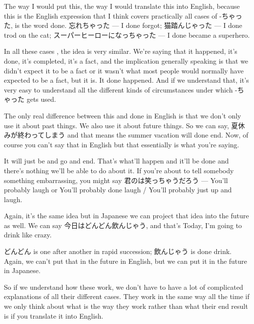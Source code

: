The way I would put this, the way I would translate this into English, because this is the English expression that I think covers practically all cases of -ちゃった, is the word done. 忘れちゃった --- I done forgot; 猫踏んじゃった --- I done trod on the cat; スーパーヒーローになっちゃった --- I done became a superhero.

In all these cases , the idea is very similar. We're saying that it happened, it's done, it's completed, it's a fact, and the implication generally speaking is that we didn't expect it to be a fact or it wasn't what most people would normally have expected to be a fact, but it is. It done happened. And if we understand that, it's very easy to understand all the different kinds of circumstances under which -ちゃった gets used.

The only real difference between this and done in English is that we don't only use it about past things. We also use it about future things. So we can say, 夏休みが終わってしまう and that means the summer vacation will done end. Now, of course you can't say that in English but that essentially is what you're saying.

It will just be and go and end. That's what'll happen and it'll be done and there's nothing we'll be able to do about it. If you're about to tell somebody something embarrassing, you might say 君のは笑っちゃうだろう --- You'll probably laugh or You'll probably done laugh / You'll probably just up and laugh.

Again, it's the same idea but in Japanese we can project that idea into the future as well. We can say 今日はどんどん飲んじゃう, and that's Today, I'm going to drink like crazy.

どんどん is one after another in rapid succession; 飲んじゃう is done drink. Again, we can't put that in the future in English, but we can put it in the future in Japanese.

So if we understand how these work, we don't have to have a lot of complicated explanations of all their different cases. They work in the same way all the time if we only think about what is the way they work rather than what their end result is if you translate it into English.

{}

\stopsectionlevel
